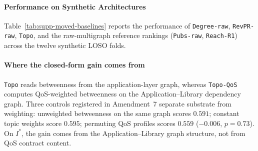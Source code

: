 \documentclass[preprint,3p]{elsarticle}
\begin{document}
\paragraph{Performance on Synthetic Architectures}
Table~\ref{tab:supp-moved-baselines} reports the performance of \texttt{Degree-raw}, \texttt{RevPR-raw}, \texttt{Topo}, and the raw-multigraph reference rankings (\texttt{Pubs-raw}, \texttt{Reach-R1}) across the twelve synthetic LOSO folds.

\begin{table}[htbp]
\centering
\small
\caption{Non-registered training-free baselines and exploratory raw-graph references evaluated under Leave-One-Scenario-Out (LOSO) cross-validation across twelve synthetic architectures (Application population). $\Delta\rho$ is paired by fold against \texttt{Topo-QoS} with a bootstrap 95\% CI; two-sided Wilcoxon signed-rank test against \texttt{Topo-QoS}.}
\label{tab:supp-moved-baselines}
\end{table}

\paragraph{Where the closed-form gain comes from} \texttt{Topo} reads betweenness from the application-layer graph, whereas \texttt{Topo-QoS} computes QoS-weighted betweenness on the Application--Library dependency graph. Three controls registered in Amendment~7 separate substrate from weighting: unweighted betweenness on the same graph scores $0.591$; constant topic weights score $0.595$; permuting QoS profiles scores $0.559$ ($-0.006$, $p = 0.73$). On $I^*$, the gain comes from the Application--Library graph structure, not from QoS contract content.
\end{document}
